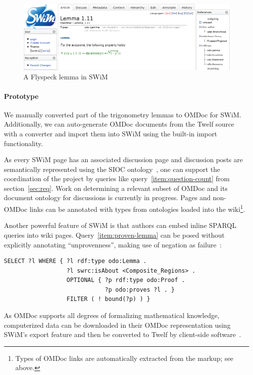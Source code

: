 \begin{contribution}
\begin{figure}
  \centering
  \includegraphics[width=\textwidth]{images/swim-lemma}
  \caption{A Flyspeck lemma in SWiM}
  \label{fig:swim-lemma}
\end{figure}

\paragraph{Prototype} We manually converted part of the trigonometry lemmas to
OMDoc for SWiM.  Additionally, we can auto-generate OMDoc documents from the
Twelf source with a converter and import them into SWiM using the built-in
import functionality.

As every SWiM page has an associated discussion page and discussion posts are
semantically represented using the SIOC ontology~\cite{SIOC:web}, one can support
the coordination of the project by queries like query~\ref{item:question-count}
from section~\ref{sec:req}.  Work on determining a relevant subset of OMDoc and
its document ontology for discussions is currently in progress.  Pages and non-OMDoc
links can be annotated with types from ontologies loaded into the
wiki\footnote{Types of OMDoc links are automatically extracted from the markup;
  see above.}.

Another powerful feature of SWiM is that authors can embed inline SPARQL queries
into wiki pages.  Query~\ref{item:proven-lemma} can be posed without explicitly
annotating ``unprovenness'', making use of negation as
failure~\cite{PruSea08:sparql}:

\begin{lstlisting}
SELECT ?l WHERE { ?l rdf:type odo:Lemma .
                  ?l swrc:isAbout <Composite_Regions> .
                  OPTIONAL { ?p rdf:type odo:Proof .
                             ?p odo:proves ?l . }
                  FILTER ( ! bound(?p) ) }
\end{lstlisting}

As OMDoc supports all degrees of formalizing mathematical knowledge,
computerized data can be downloaded in their OMDoc representation using SWiM's
export feature and then be converted to Twelf by client-side
software~\cite[chap.\ 25.2]{Kohlhase:omdoc1.2}.
\end{contribution}

